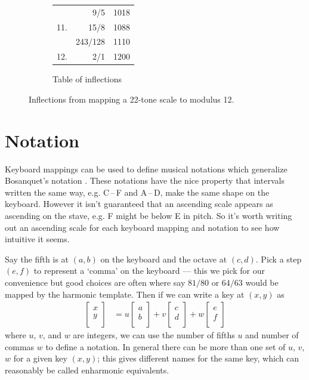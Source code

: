 \documentclass[a4paper,11pt]{article}
\newcommand\intervalsep{\,--\,}
\begin{document}
\begin{figure}
\begin{subfigure}{0.4\textwidth}
\begin{tabular}{rrr}
        &       9/5     &       1018\vspace{0.25cm} \\
11.     &       15/8    &       1088    \\
        &       243/128 &       1110\vspace{0.25cm} \\
12.     &       2/1     &       1200    \\
\bottomrule
\end{tabular}
\vspace{0.5cm}
\caption{Table of inflections}
\vspace{0.25cm}
\label{fig:indic-inflections}
\end{subfigure}
\caption{Inflections from mapping a 22-tone scale to modulus 12.}
\end{figure}

\clearpage
\section{Notation}
\label{sec:notation}
Keyboard mappings can be used to define musical notations which generalize
Bosanquet's notation \cite{bosanquet1876temperament}. These notations have the
nice property that intervals written the same way, e.g. C\intervalsep{}F and
A\intervalsep{}D, make the same shape on the keyboard.  However it isn't
guaranteed that an ascending scale appears as ascending on the stave, e.g. F
might be below E in pitch. So it's worth writing out an ascending scale for
each keyboard mapping and notation to see how intuitive it seems.

Say the fifth is at $(a, b)$ on the keyboard and the octave at $(c, d)$. Pick a
step $(e, f)$ to represent a `comma' on the keyboard --- this we pick for our
convenience but good choices are often where say $81/80$ or $64/63$ would be
mapped by the harmonic template. Then if we can write a key at $(x, y)$ as
\begin{align}
\begin{bmatrix}
    x \\
    y \\
\end{bmatrix}
    &=
u
\begin{bmatrix}
    a \\
    b \\
\end{bmatrix}
    +
v
\begin{bmatrix}
    c \\
    d \\
\end{bmatrix}
    +
w
\begin{bmatrix}
    e \\
    f \\
\end{bmatrix}
\label{eq:notation}
\end{align}
where $u$, $v$, and $w$ are integers, we can use the number of fifths $u$ and
number of commas $w$ to define a notation. In general there can be more than
one set of $u$, $v$, $w$ for a given key $(x, y)$; this gives different names
for the same key, which can reasonably be called enharmonic equivalents.
\end{document}
